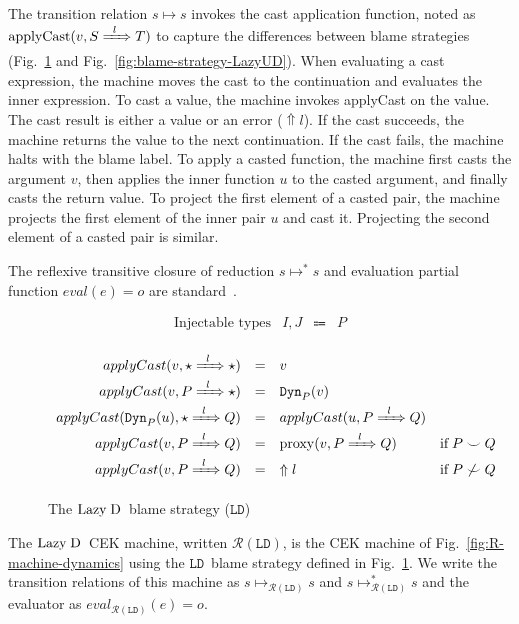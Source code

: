 \documentclass[runningheads]{llncs}
\newcommand{\sidecond}[1]{\text{if}\;#1}
\newcommand{\figequalto}[3]{#1 & = & #2 & #3 \\}
\newcommand{\stxrule}[3]{\text{#2} & #1 & \Coloneqq & #3\\}
\newcommand{\figref}[1]{Fig.~\ref{#1}}
\newcommand{\LD}{\ensuremath{\text{Lazy\;D}}}
\newcommand{\RMachine}[1]{\ensuremath{\mathcal{R}(#1)}}
\newcommand{\LDMachine}{\RMachine{\BLD}}
\newcommand{\just}[1]{\ensuremath{#1}}
\newcommand{\error}[1]{\ensuremath{\Uparrow#1}}
\newcommand{\Tdyn}[0]{\ensuremath{\star}}
\newcommand{\ccast}[3]{#1 \xRightarrow[]{\enskip #2 \enskip} #3}
\newcommand{\vdyn}[2]{\mathtt{Dyn}_{#1}(#2)}
\newcommand{\BLD}[0]{\ensuremath{\mathtt{LD}}}
\newcommand{\proxy}[2]{\ensuremath{\mathrm{proxy}(#1,#2)}}
\newcommand{\applyCast}[2]{\ensuremath{\mathrm{applyCast}(#1,#2)}}
\newcommand{\shallowlyconsistent}[2]{\ensuremath{#1\smile#2}}
\newcommand{\notshallowlyconsistent}[2]{\ensuremath{#1\not\smile#2}}
\newcommand{\transitivelyreduceto}[2]{\ensuremath{#1 \longmapsto^{*} #2}}
\newcommand{\transitivelyreducetoD}[2]{
	\ensuremath{#1 \longmapsto_{\LDMachine}^{*} #2}}
\newcommand{\reduceto}[2]{\ensuremath{#1 \longmapsto #2}}
\newcommand{\reducetoR}[3]{\ensuremath{#2 \longmapsto_{\RMachine{#1}} #3}}
\newcommand{\reducetoD}[2]{\reducetoR{\BLD}{#1}{#2}}
\newcommand{\evalto}[2]{\ensuremath{\mathit{eval}(#1)=#2}}
\newcommand{\evaltoR}[3]{\ensuremath{\mathit{eval}_{\RMachine{#1}}(#2)=#3}}
\newcommand{\evaltoD}[2]{\evaltoR{\BLD}{#1}{#2}}
\begin{document}
The transition relation \reduceto{s}{s} invokes the cast application
function, noted as $\applyCast{v}{\ccast{S}{l}{T}}$ to capture the
differences between blame strategies
(Fig.~\ref{fig:blame-strategy-LazyD} and
Fig.~\ref{fig:blame-strategy-LazyUD}).
%
When evaluating a cast expression, the machine moves the cast to the
continuation and evaluates the inner expression.
%
To cast a value, the machine invokes applyCast on the value. The cast
result is either a value or an error (\error{l}). If the cast
succeeds, the machine returns the value to the next continuation.  If
the cast fails, the machine halts with the blame label.
%
To apply a casted function, the machine first casts the argument $v$, then
applies the inner function $u$ to the casted argument, and finally
casts the return value.
%
To project the first element of a casted pair, the machine projects
the first element of the inner pair $u$ and cast it.
%
Projecting the second element of a casted pair is similar.

The reflexive transitive closure of reduction \transitivelyreduceto{s}{s}
and evaluation partial function ${\evalto{e}{o}}$ are standard~\citep{felleisen03:_pllc}.

\begin{figure}
\[
\begin{array}{lrcl}
\stxrule{I,J}{Injectable types}{P}
\end{array}
\]
	
\fbox{$\mathit{applyCast}_{\BLD}(v,\ccast{S}{l}{T}) = r$}
\[
\begin{array}{rclr}
\figequalto{
	applyCast(v,\ccast{\Tdyn}{l}{\Tdyn})
}{
	\just{v}
}{}
\figequalto{
applyCast(v,\ccast{P}{l}{\Tdyn})
}{
	\just{\vdyn{P}{v}}
}{}
\figequalto{
	applyCast(\vdyn{P}{u},\ccast{\Tdyn}{l}{Q})
}{
	applyCast(u,\ccast{P}{l}{Q})
}{}
\figequalto{
	applyCast(v,\ccast{P}{l}{Q})
}{
	\just{\proxy{v}{\ccast{P}{l}{Q}}}
}{\sidecond{\shallowlyconsistent{P}{Q}}}
\figequalto{
	applyCast(v,\ccast{P}{l}{Q})
}{
	\error{l}
}{\sidecond{\notshallowlyconsistent{P}{Q}}}
\end{array}
\]
\caption{The \LD\ blame strategy (\BLD)}
\label{fig:blame-strategy-LazyD}
\end{figure}

\begin{definition}[\LD\ CEK Machine, \LDMachine]
The \LD\ CEK machine, written \LDMachine, is the CEK machine of
\figref{fig:R-machine-dynamics} using the \BLD\ blame strategy defined in 
\figref{fig:blame-strategy-LazyD}.  We write the transition relations of
this machine as \reducetoD{s}{s} and \transitivelyreducetoD{s}{s}
and the evaluator as \evaltoD{e}{o}.
\end{definition}
\end{document}
